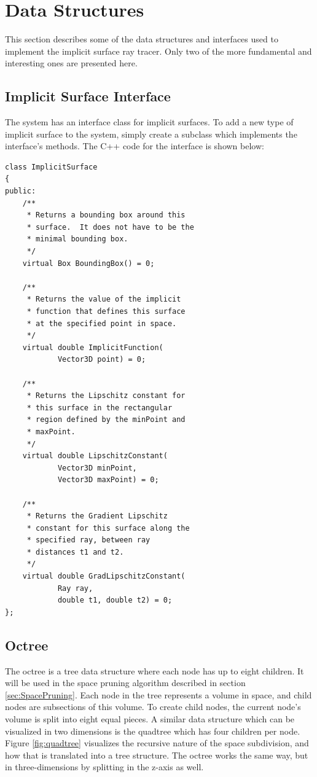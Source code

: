 \documentclass[conference]{acmsiggraph}
\begin{document}
\section{Data Structures}

This section describes some of the data structures and interfaces 
used to implement the implicit surface ray tracer.  Only two of the 
more fundamental and interesting ones are presented here.

\subsection{Implicit Surface Interface}

The system has an interface class for implicit surfaces.  To add a new
type of implicit surface to the system, simply create a subclass
which implements the interface's methods.  The C++ code for the interface
is shown below:

\begin{verbatim}
class ImplicitSurface
{
public:
    /**
     * Returns a bounding box around this 
     * surface.  It does not have to be the 
     * minimal bounding box.
     */
    virtual Box BoundingBox() = 0;
    
    /**
     * Returns the value of the implicit 
     * function that defines this surface
     * at the specified point in space.
     */
    virtual double ImplicitFunction(
            Vector3D point) = 0;
    
    /**
     * Returns the Lipschitz constant for 
     * this surface in the rectangular
     * region defined by the minPoint and 
     * maxPoint.
     */
    virtual double LipschitzConstant(
            Vector3D minPoint, 
            Vector3D maxPoint) = 0;

    /**
     * Returns the Gradient Lipschitz 
     * constant for this surface along the
     * specified ray, between ray 
     * distances t1 and t2.
     */
    virtual double GradLipschitzConstant(
            Ray ray, 
            double t1, double t2) = 0;
};
\end{verbatim}

\subsection{Octree}
\label{sec:Octree}

The octree is a tree data structure where each node has up to eight 
children.  It will be used in the space pruning algorithm described in
section \ref{sec:SpacePruning}.  Each node in the tree represents a volume
in space, and child nodes are subsections of this volume.  To create
child nodes, the current node's volume is split into eight equal pieces.
A similar data structure which can be visualized in two dimensions is
the quadtree which has four children per node.  Figure \ref{fig:quadtree}
visualizes the recursive nature of the space subdivision, and how that is translated
into a tree structure. 
The octree works the same way, but in three-dimensions by splitting in
the z-axis as well.
\end{document}
